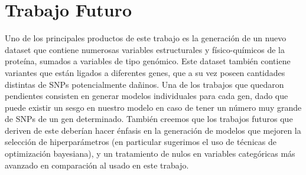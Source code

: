 \section{Trabajo Futuro}

Uno de los principales productos de este trabajo es la generación de un nuevo dataset que contiene numerosas variables estructurales y físico-químicos de la proteína, sumados a variables de tipo genómico. Este dataset también contiene variantes que están ligados a diferentes genes, que a su vez poseen cantidades distintas de SNPs potencialmente dañinos. Una de los trabajos que quedaron pendientes consisten en generar modelos individuales para cada gen, dado que puede existir un sesgo en nuestro modelo en caso de tener un número muy grande de SNPs de un gen determinado. También creemos que los trabajos futuros que deriven de este deberían hacer énfasis en la generación de modelos que mejoren la selección de hiperparámetros (en particular sugerimos el uso de técnicas de optimización bayesiana), y un tratamiento de nulos en variables categóricas más avanzado en comparación al usado en este trabajo. 

